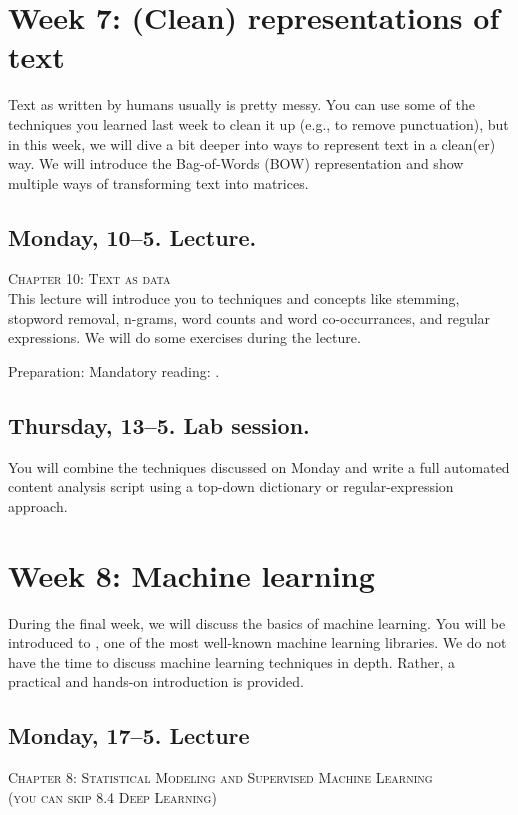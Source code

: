 \section*{Week 7: (Clean) representations of text}

Text as written by humans usually is pretty messy. You can use some of the techniques you learned last week to clean it up (e.g., to remove punctuation), but in this week, we will dive a bit deeper into ways to represent text in a clean(er) way. We will introduce the Bag-of-Words (BOW) representation and show multiple ways of transforming text into matrices.

\subsection*{Monday, 10--5. Lecture.}
\textsc{ Chapter 10: Text as data}\\
This lecture will introduce you to techniques and concepts like stemming, stopword removal, n-grams, word counts and word co-occurrances, and regular expressions. We will do some exercises during the lecture.

Preparation: Mandatory reading: \cite{Boumans2016}.

\subsection*{Thursday, 13--5. Lab session.}
You will combine the techniques discussed on Monday and write a full automated content analysis script using a top-down dictionary or regular-expression approach.

\section*{Week 8: Machine learning}
During the final week, we will discuss the basics of machine learning. You will be introduced to \citep{scikit-learn}, one of the most well-known machine learning libraries. We do not have the time to discuss machine learning techniques in depth. Rather, a practical and hands-on introduction is provided. 

\subsection*{Monday, 17--5. Lecture}
\textsc{ Chapter 8: Statistical Modeling and Supervised Machine Learning}\\
\textsc{ (you can skip 8.4 Deep Learning)}\\

